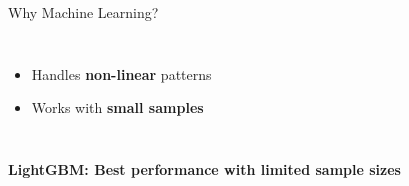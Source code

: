 \documentclass[aspectratio=169, 11pt, t]{beamer}
\begin{document}
\begin{frame}{Why Machine Learning?}
\begin{columns}[t, onlytextwidth]
            \vspace{0.3em}
            {\scriptsize
            \begin{itemize}\setlength{\itemsep}{2pt}
                \item Handles \textbf{non-linear} patterns
                \item Works with \textbf{small samples}
            \end{itemize}}
    \end{columns}
    
    \vspace{0.4cm}
    \begin{center}
        \color{CardiffRed}\textbf{LightGBM: Best performance with limited sample sizes}
    \end{center}
\end{frame}
\end{document}
